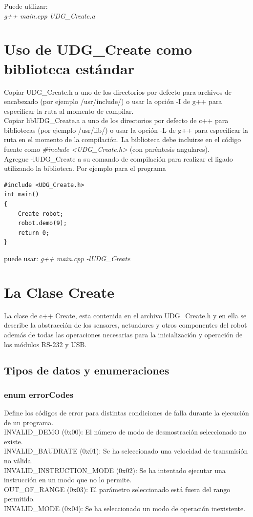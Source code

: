 \documentclass[letterpaper,openright,12pt]{book}
\begin{document}
Puede utilizar:\\
\emph{g++ main.cpp UDG\_Create.a}

\section{Uso de UDG\_Create como biblioteca estándar}
Copiar UDG\_Create.h a uno de los directorios por defecto para archivos de encabezado (por ejemplo /usr/include/) o usar la opción -I de g++ para especificar la ruta al momento de compilar.\\
Copiar libUDG\_Create.a a uno de los directorios por defecto de c++ para bibliotecas (por ejemplo /usr/lib/) o usar la opción -L de g++ para especificar la ruta en el momento de la compilación.
La biblioteca debe  incluirse en el código fuente como \emph{\#include {\textless}UDG\_Create.h\textgreater} (con paréntesis angulares).\\
Agregue -lUDG\_Create a su comando de compilación para realizar el ligado utilizando la biblioteca. Por ejemplo para el programa\\
\begin{lstlisting}[caption={main.cpp}]
#include <UDG_Create.h>
int main()
{
	Create robot;
	robot.demo(9);
	return 0;
}

\end{lstlisting}

puede usar:
\emph{g++ main.cpp -lUDG\_Create}
\section{La Clase Create}
La clase de c++ Create, esta contenida en el archivo UDG\_Create.h y en ella se describe la abstracción de los sensores, actuadores y otros componentes del robot además de todas las operaciones necesarias para la inicialización y operación de los módulos RS-232 y USB.
\subsection{Tipos de datos y enumeraciones}
\subsubsection{enum errorCodes}
Define los códigos de error para distintas condiciones de falla durante la ejecución de un programa.\\
INVALID\_DEMO (0x00): El número de modo de desmostración seleccionado no existe.\\
INVALID\_BAUDRATE (0x01): Se ha seleccionado una velocidad de transmisión no válida.\\
INVALID\_INSTRUCTION\_MODE (0x02): Se ha intentado ejecutar una instrucción en un modo que no lo permite.\\
OUT\_OF\_RANGE (0x03): El parámetro seleccionado está fuera del rango permitido.\\
INVALID\_MODE (0x04): Se ha seleccionado un modo de operación inexistente.\\
\end{document}
